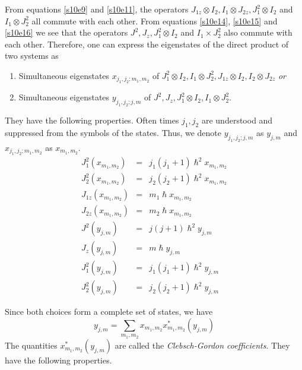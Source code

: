 \documentclass{article}
\numberwithin{equation}{section}
\theoremstyle{plain}
\numberwithin{thm}{section}
\theoremstyle{plain}
\numberwithin{prop}{section}
\theoremstyle{definition}
\numberwithin{defn}{section}
\theoremstyle{remark}
\begin{document}
From equations \eqref{s10e9} and \eqref{s10e11}, the operators $J_{1z} \otimes
I_2, I_1 \otimes J_{2z}, J_1^2 \otimes I_2$ and $I_1 \otimes J_2^2$ all 
commute with each other. From equations \eqref{s10e14}, \eqref{s10e15} and
\eqref{s10e16} we see that the operators $J^2, J_z, J_1^2 \otimes I_2$ and 
$I_1 \times J_2^2$ also commute with each other. Therefore, one can express
the eigenstates of the direct product of two systems as
\begin{enumerate}
\item Simultaneous eigenstates $x_{j_1,j_2;m_1,m_2}$ of $J_1^2 \otimes I_2, 
I_1 \otimes J_2^2, J_{1z} \otimes I_2, I_2 \otimes J_{2z}$ \emph{or}
\item Simultaneous eigenstates $y_{j_1,j_2;j,m}$ of $J^2, J_z, J_1^2 \otimes 
I_2, I_1 \otimes J_2^2$.
\end{enumerate} 

They have the following properties. Often times $j_1, j_2$ are understood
and suppressed from the symbols of the states. Thus, we denote $y_{j_1,j_2;j,m}$
as $y_{j,m}$ and $x_{j_1,j_2;m_1,m_2}$ as $x_{m_1,m_2}$.
\begin{eqnarray}
J_1^2(x_{m_1,m_2}) &=& j_1(j_1 + 1)\hslash^2 x_{m_1,m_2}
\label{s10e20} \\
J_2^2(x_{m_1,m_2}) &=& j_2(j_2 + 1)\hslash^2 x_{m_1,m_2}
\label{s10e21} \\
J_{1z}(x_{m_1,m_2}) &=& m_1\hslash x_{m_1,m_2}\label{s10e22} \\
J_{2z}(x_{m_1,m_2}) &=& m_2\hslash x_{m_1,m_2}\label{s10e23} \\
J^2(y_{j,m}) &=& j(j+1)\hslash^2 y_{j,m} \label{s10e24} \\
J_z(y_{j,m}) &=& m\hslash y_{j,m} \label{s10e25} \\
J_1^2(y_{j,m}) &=& j_1(j_1+1)\hslash^2 y_{j,m} \label{s10e26} \\
J_2^2(y_{j,m}) &=& j_2(j_2+1)\hslash^2 y_{j,m} \label{s10e27} 
\end{eqnarray}

Since both choices form a complete set of states, we have
\begin{equation}\label{s10e28}
y_{j,m} = \sum_{m_1, m_2}x_{m_1,m_2}x_{m_1,m_2}^\ast (y_{j,m})
\end{equation}
The quantities $x_{m_1,m_2}^\ast(y_{j,m})$ are called the \emph{Clebsch-Gordon coefficients}. They have the following properties.
\end{document}
